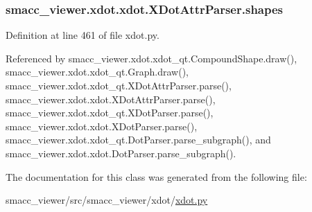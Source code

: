 \subsubsection[{\texorpdfstring{shapes}{shapes}}]{\setlength{\rightskip}{0pt plus 5cm}smacc\+\_\+viewer.\+xdot.\+xdot.\+X\+Dot\+Attr\+Parser.\+shapes}\hypertarget{classsmacc__viewer_1_1xdot_1_1xdot_1_1XDotAttrParser_a75c4d4c35b28bd87da264ed73689c11b}{}\label{classsmacc__viewer_1_1xdot_1_1xdot_1_1XDotAttrParser_a75c4d4c35b28bd87da264ed73689c11b}


Definition at line 461 of file xdot.\+py.



Referenced by smacc\+\_\+viewer.\+xdot.\+xdot\+\_\+qt.\+Compound\+Shape.\+draw(), smacc\+\_\+viewer.\+xdot.\+xdot\+\_\+qt.\+Graph.\+draw(), smacc\+\_\+viewer.\+xdot.\+xdot\+\_\+qt.\+X\+Dot\+Attr\+Parser.\+parse(), smacc\+\_\+viewer.\+xdot.\+xdot.\+X\+Dot\+Attr\+Parser.\+parse(), smacc\+\_\+viewer.\+xdot.\+xdot\+\_\+qt.\+X\+Dot\+Parser.\+parse(), smacc\+\_\+viewer.\+xdot.\+xdot.\+X\+Dot\+Parser.\+parse(), smacc\+\_\+viewer.\+xdot.\+xdot\+\_\+qt.\+Dot\+Parser.\+parse\+\_\+subgraph(), and smacc\+\_\+viewer.\+xdot.\+xdot.\+Dot\+Parser.\+parse\+\_\+subgraph().



The documentation for this class was generated from the following file\+:\begin{DoxyCompactItemize}
\item 
smacc\+\_\+viewer/src/smacc\+\_\+viewer/xdot/\hyperlink{xdot_8py}{xdot.\+py}\end{DoxyCompactItemize}
